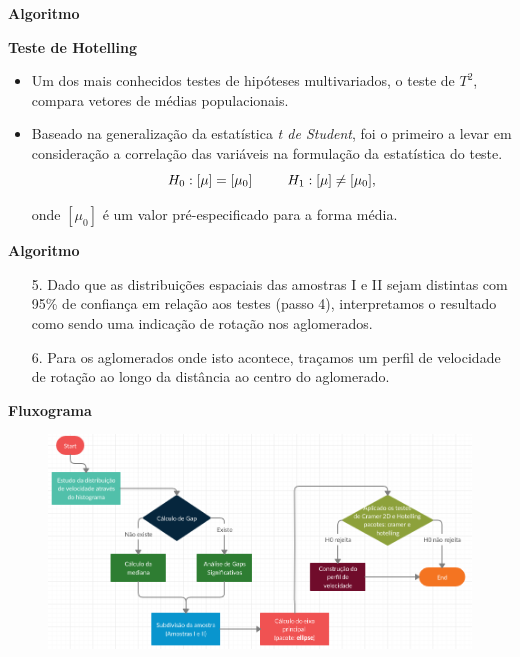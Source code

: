 \documentclass[xcolor=dvipsnames,10pt]{beamer}
\begin{document}
\begin{frame}{\textbf{Algoritmo}}
  \begin{block}{{\textbf{Teste de Hotelling}}}
    \begin{itemize}
      \item  Um dos mais conhecidos testes de hipóteses multivariados, o teste de $T^2$, compara vetores de médias populacionais.
      \item Baseado na generalização da estatística \textit{t de Student}, foi o primeiro a levar em consideração a correlação das variáveis na formulação da estatística do teste.
      \begin{equation}
        H_0 : [\mu] = [\mu_0] \hspace{6 ex} H_1 : [\mu] \neq [\mu_0],     
        \end{equation}
  
        onde $[\mu_0]$ é um valor pré-especificado para a forma média.
    \end{itemize}
  \end{block}
\end{frame}

\begin{frame}{\textbf{Algoritmo}}
  \begin{enumerate}
    \item[5.] Dado que as distribuições espaciais das amostras I e II sejam distintas com 95\% de confiança em relação aos testes (passo 4), interpretamos o resultado como sendo uma indicação de rotação nos aglomerados.
    \item[6.] Para os aglomerados onde isto acontece, traçamos um perfil de velocidade de rotação ao longo da distância ao centro do aglomerado.
  \end{enumerate}
\end{frame}

\begin{frame}{\textbf{Fluxograma}}
  \begin{figure}[!htbp]
    \centering
    \includegraphics[scale=.3]{resultados/fluxograma.png}
  \end{figure}
\end{frame}
\end{document}
